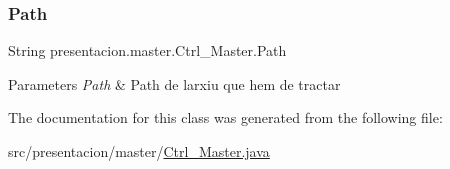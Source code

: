 \subsubsection{\texorpdfstring{Path}{Path}}
{\footnotesize\ttfamily String presentacion.\+master.\+Ctrl\+\_\+\+Master.\+Path\hspace{0.3cm}{\ttfamily [package]}}


\begin{DoxyParams}{Parameters}
{\em Path} & Path de l\textquotesingle{}arxiu que hem de tractar \\
\hline
\end{DoxyParams}


The documentation for this class was generated from the following file\+:\begin{DoxyCompactItemize}
\item 
src/presentacion/master/\hyperlink{Ctrl__Master_8java}{Ctrl\+\_\+\+Master.\+java}\end{DoxyCompactItemize}
